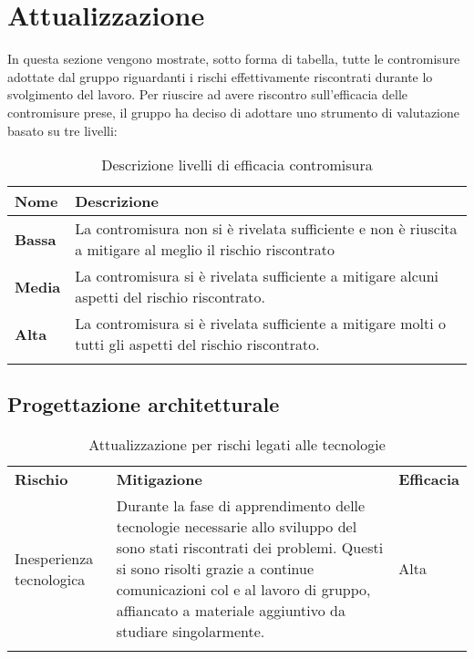 \appendix

\section{Attualizzazione}

In questa sezione vengono mostrate, sotto forma di tabella, tutte le contromisure adottate dal gruppo \gruppo{} riguardanti i rischi effettivamente riscontrati durante lo svolgimento del lavoro.  Per riuscire ad avere riscontro sull'efficacia delle contromisure prese, il gruppo ha deciso di adottare uno strumento di valutazione basato su tre livelli:

\setlength{\freewidth}{\dimexpr\textwidth-0\tabcolsep}
	\renewcommand{\arraystretch}{1.5}
	\setlength{\aboverulesep}{0pt}
	\setlength{\belowrulesep}{0pt}
	\begin{longtable}{L{.210\freewidth} L{.6\freewidth} }
		\toprule 
		\textbf{Nome} & \textbf{Descrizione} \\
		\hline
		\textbf{Bassa} & La contromisura non si è rivelata sufficiente e non è riuscita a mitigare al meglio il rischio riscontrato \\
		\textbf{Media} & La contromisura si è rivelata sufficiente a mitigare alcuni aspetti del rischio riscontrato. \\
		\textbf{Alta} & La contromisura si è rivelata sufficiente a mitigare molti o tutti gli aspetti del rischio riscontrato.\\
		\endhead		
		\hiderowcolors
		\caption{Descrizione livelli di efficacia contromisura }
	\end{longtable}

\subsection{Progettazione architetturale}

\setlength{\freewidth}{\dimexpr\textwidth-0\tabcolsep}
	\renewcommand{\arraystretch}{1.5}
	\setlength{\aboverulesep}{0pt}
	\setlength{\belowrulesep}{0pt}
	\begin{longtable}{L{.210\freewidth} L{.6\freewidth} L{.1\freewidth}}
		\toprule 
		\\
		\toprule
		\textbf{Rischio} & \textbf{Mitigazione} & \textbf{Efficacia} \\
		\hline
		Inesperienza tecnologica & Durante la fase di apprendimento delle tecnologie necessarie allo sviluppo del  sono stati riscontrati dei problemi. Questi si sono risolti grazie a continue comunicazioni col  e al lavoro di gruppo, affiancato a materiale aggiuntivo da studiare singolarmente. & Alta\\
		\endhead		
		\hiderowcolors
		\caption{Attualizzazione per rischi legati alle tecnologie }
	\end{longtable}
	


